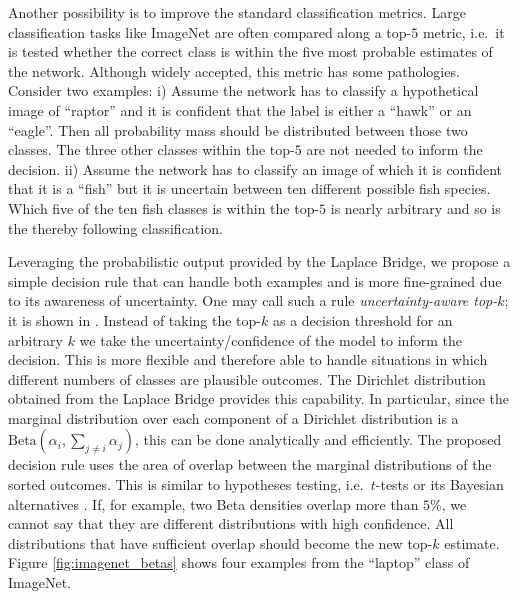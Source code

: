 Another possibility is to improve the standard classification metrics. Large classification tasks like ImageNet are often compared along a top-$5$ metric, i.e.~it is tested whether the correct class is within the five most probable estimates of the network. Although widely accepted, this metric has some pathologies. Consider two examples: i) Assume the network has to classify a hypothetical image of ``raptor'' and it is confident that the label is either a ``hawk'' or an ``eagle''. Then all probability mass should be distributed between those two classes. The three other classes within the top-$5$ are not needed to inform the decision. ii) Assume the network has to classify an image of which it is confident that it is a ``fish'' but it is uncertain between ten different possible fish species. Which five of the ten fish classes is within the top-$5$ is nearly arbitrary and so is the thereby following classification.

Leveraging the probabilistic output provided by the Laplace Bridge, we propose a simple decision rule that can handle both examples and is more fine-grained due to its awareness of uncertainty. One may call such a rule \emph{uncertainty-aware top-$k$}; it is shown in . Instead of taking the top-$k$ as a decision threshold for an arbitrary $k$ we take the uncertainty/confidence of the model to inform the decision. This is more flexible and therefore able to handle situations in which different numbers of classes are plausible outcomes. The Dirichlet distribution obtained from the Laplace Bridge provides this capability. In particular, since the marginal distribution over each component of a Dirichlet distribution is a $\mathrm{Beta}(\alpha_i, \sum_{j\neq i} \alpha_j)$, this can be done analytically and efficiently. The proposed decision rule uses the area of overlap between the marginal distributions of the sorted outcomes. This is similar to hypotheses testing, i.e.~$t$-tests \cite{nickerson2000null} or its Bayesian alternatives \cite{BayesianAltTTest2011}. If, for example, two Beta densities overlap more than $5\%$, we cannot say that they are different distributions with high confidence. All distributions that have sufficient overlap should become the new top-$k$ estimate. Figure \ref{fig:imagenet_betas} shows four examples from the ``laptop'' class of ImageNet.

